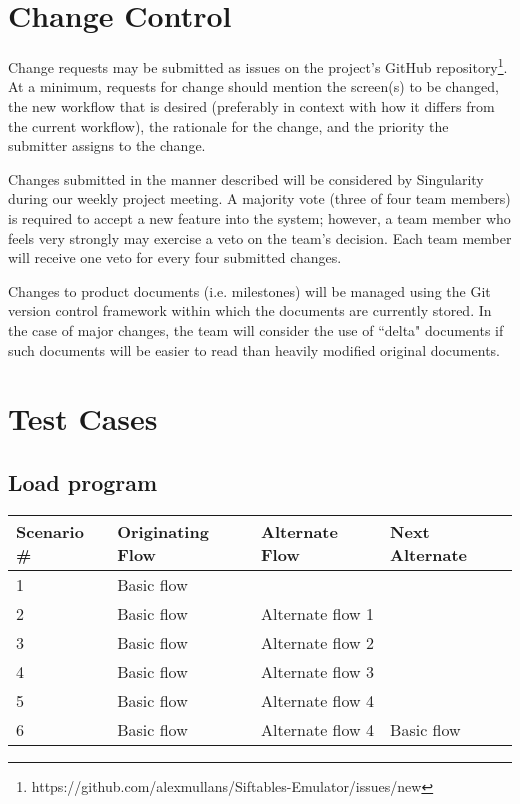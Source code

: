 \documentclass[12pt]{article}
\begin{document}
\section{Change Control}
Change requests may be submitted as issues on the project's GitHub repository\footnote{https://github.com/alexmullans/Siftables-Emulator/issues/new}. At a minimum, requests for change should mention the screen(s) to be changed, the new workflow that is desired (preferably in context with how it differs from the current workflow), the rationale for the change, and the priority the submitter assigns to the change.

Changes submitted in the manner described will be considered by Singularity during our weekly project meeting. A majority vote (three of four team members) is required to accept a new feature into the system; however, a team member who feels very strongly may exercise a veto on the team's decision. Each team member will receive one veto for every four submitted changes.

Changes to product documents (i.e. milestones) will be managed using the Git version control framework within which the documents are currently stored. In the case of major changes, the team will consider the use of ``delta" documents if such documents will be easier to read than heavily modified original documents.

\clearpage
\section{Test Cases}

\subsection{Load program}

\begin{table}[h!]
  \begin{tabular}{l | l | l | l}
    \textbf{Scenario \#} &
    \textbf{Originating Flow} &
    \textbf{Alternate Flow} &
    \textbf{Next Alternate} \\ \hline

    1 &
    Basic flow &
    &
    \\ \hline

    2 &
    Basic flow &
    Alternate flow 1 &
    \\ \hline

    3 &
    Basic flow &
    Alternate flow 2 &
    \\ \hline

    4 &
    Basic flow &
    Alternate flow 3 &
    \\ \hline

    5 &
    Basic flow &
    Alternate flow 4 &
    \\ \hline

    6 &
    Basic flow &
    Alternate flow 4 &
    Basic flow \\ \hline

  \end{tabular}
\end{table}
\end{document}
